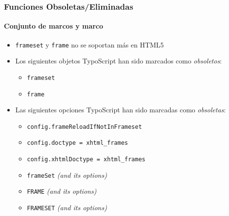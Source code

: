 \begin{frame}[fragile]
	\frametitle{Funciones Obsoletas/Eliminadas}
	\framesubtitle{Conjunto de marcos y marco}

	\begin{itemize}
		\item \texttt{frameset} y \texttt{frame} no se soportan más en HTML5
		\item Los siguientes objetos TypoScript han sido marcados como \textit{obsoletos}:

			\begin{itemize}
				\item \texttt{frameset}
				\item \texttt{frame}
			\end{itemize}

		\item Las siguientes opciones TypoScript han sido marcadas como \textit{obsoletas}:

			\begin{itemize}
				\item \texttt{config.frameReloadIfNotInFrameset}
				\item \texttt{config.doctype = xhtml\_frames}
				\item \texttt{config.xhtmlDoctype = xhtml\_frames}
				\item \texttt{frameSet} \tabto{1.8cm}\textit{(and its options)}
				\item \texttt{FRAME} \tabto{1.8cm}\textit{(and its options)}
				\item \texttt{FRAMESET} \tabto{1.8cm}\textit{(and its options)}
			\end{itemize}

	\end{itemize}

\end{frame}





